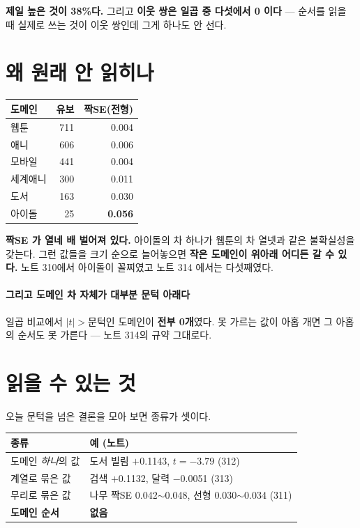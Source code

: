 \documentclass[10pt]{article}
\begin{document}
\textbf{제일 높은 것이 38\%다.} 그리고 \textbf{이웃 쌍은 일곱 중 다섯에서
0 이다} --- 순서를 읽을 때 실제로 쓰는 것이 이웃 쌍인데 그게 하나도 안 선다.

\section{왜 원래 안 읽히나}

\begin{center}\small
\begin{tabular}{lrr}
\hline
도메인 & 유보 & 짝SE(전형) \\
\hline
웹툰 & 711 & 0.004 \\
애니 & 606 & 0.006 \\
모바일 & 441 & 0.004 \\
세계애니 & 300 & 0.011 \\
도서 & 163 & 0.030 \\
아이돌 & 25 & \textbf{0.056} \\
\hline
\end{tabular}
\end{center}

\textbf{짝SE 가 열네 배 벌어져 있다.} 아이돌의 차 하나가 웹툰의 차 열넷과
같은 불확실성을 갖는다. 그런 값들을 크기 순으로 늘어놓으면 \textbf{작은
도메인이 위아래 어디든 갈 수 있다.} 노트 310에서 아이돌이 꼴찌였고 노트 314
에서는 다섯째였다.

\paragraph{그리고 도메인 차 자체가 대부분 문턱 아래다} 일곱 비교에서
$|t|{>}$문턱인 도메인이 \textbf{전부 0개}였다. 못 가르는 값이 아홉 개면
그 아홉의 순서도 못 가른다 --- 노트 314의 규약 그대로다.

\section{읽을 수 있는 것}

오늘 문턱을 넘은 결론을 모아 보면 종류가 셋이다.

\begin{center}\scriptsize
\begin{tabular}{ll}
\hline
종류 & 예 (노트) \\
\hline
도메인 \emph{하나}의 값 & 도서 빌림 $+$0.1143, $t{=}{-}3.79$ (312) \\
계열로 묶은 값 & 검색 $+$0.1132, 달력 $-$0.0051 (313) \\
무리로 묶은 값 & 나무 짝SE 0.042$\sim$0.048, 선형 0.030$\sim$0.034 (311) \\
\hline
\textbf{도메인 순서} & \textbf{없음} \\
\hline
\end{tabular}
\end{center}
\end{document}
